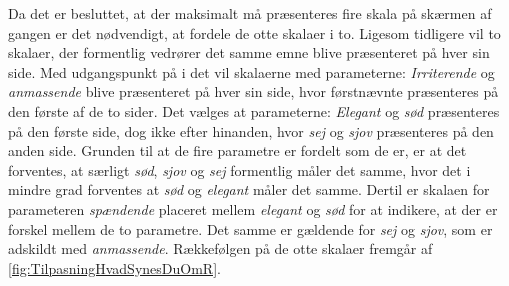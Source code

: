 Da det er besluttet, at der maksimalt må præsenteres fire skala på skærmen af gangen er det nødvendigt, at fordele de otte skalaer i to. Ligesom tidligere vil to skalaer, der formentlig vedrører det samme emne blive præsenteret på hver sin side. Med udgangspunkt på i det vil skalaerne med parameterne: \textit{Irriterende} og \textit{anmassende} blive præsenteret på hver sin side, hvor førstnævnte præsenteres på den første af de to sider. Det vælges at parameterne: \textit{Elegant} og \textit{sød} præsenteres på den første side, dog ikke efter hinanden, hvor \textit{sej} og \textit{sjov} præsenteres på den anden side. Grunden til at de fire parametre er fordelt som de er, er at det forventes, at særligt \textit{sød}, \textit{sjov} og \textit{sej} formentlig måler det samme, hvor det i mindre grad forventes at \textit{sød} og \textit{elegant} måler det samme. Dertil er skalaen for parameteren \textit{spændende} placeret mellem \textit{elegant} og \textit{sød} for at indikere, at der er forskel mellem de to parametre. Det samme er gældende for \textit{sej} og \textit{sjov}, som er adskildt med \textit{anmassende}. Rækkefølgen på de otte skalaer fremgår af \autoref{fig:TilpasningHvadSynesDuOmR}.
\newpage
%

